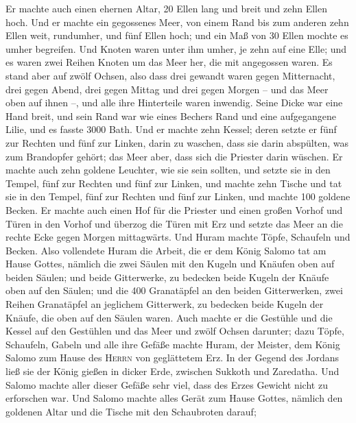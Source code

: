  Er machte auch einen ehernen Altar, 20 Ellen lang und
breit und zehn Ellen hoch.  Und er machte ein gegossenes
Meer, von einem Rand bis zum anderen zehn Ellen weit, rundumher, und
fünf Ellen hoch; und ein Maß von 30 Ellen mochte es umher begreifen.
 Und Knoten waren unter ihm umher, je zehn auf eine Elle;
und es waren zwei Reihen Knoten um das Meer her, die mit angegossen
waren.  Es stand aber auf zwölf Ochsen, also dass drei
gewandt waren gegen Mitternacht, drei gegen Abend, drei gegen Mittag und
drei gegen Morgen -- und das Meer oben auf ihnen --, und alle ihre
Hinterteile waren inwendig.  Seine Dicke war eine Hand
breit, und sein Rand war wie eines Bechers Rand und eine aufgegangene
Lilie, und es fasste 3000 Bath.  Und er machte zehn
Kessel; deren setzte er fünf zur Rechten und fünf zur Linken, darin zu
waschen, dass sie darin abspülten, was zum Brandopfer gehört; das Meer
aber, dass sich die Priester darin wüschen.  Er machte
auch zehn goldene Leuchter, wie sie sein sollten, und setzte sie in den
Tempel, fünf zur Rechten und fünf zur Linken,  und machte
zehn Tische und tat sie in den Tempel, fünf zur Rechten und fünf zur
Linken, und machte 100 goldene Becken.  Er machte auch
einen Hof für die Priester und einen großen Vorhof und Türen in den
Vorhof und überzog die Türen mit Erz  und setzte das Meer
an die rechte Ecke gegen Morgen mittagwärts.  Und Huram
machte Töpfe, Schaufeln und Becken. Also vollendete Huram die Arbeit,
die er dem König Salomo tat am Hause Gottes,  nämlich die
zwei Säulen mit den Kugeln und Knäufen oben auf beiden Säulen; und beide
Gitterwerke, zu bedecken beide Kugeln der Knäufe oben auf den Säulen;
 und die 400 Granatäpfel an den beiden Gitterwerken, zwei
Reihen Granatäpfel an jeglichem Gitterwerk, zu bedecken beide Kugeln der
Knäufe, die oben auf den Säulen waren.  Auch machte er
die Gestühle und die Kessel auf den Gestühlen  und das
Meer und zwölf Ochsen darunter;  dazu Töpfe, Schaufeln,
Gabeln und alle ihre Gefäße machte Huram, der Meister, dem König Salomo
zum Hause des \textsc{Herrn} von geglättetem Erz.  In der
Gegend des Jordans ließ sie der König gießen in dicker Erde, zwischen
Sukkoth und Zaredatha.  Und Salomo machte aller dieser
Gefäße sehr viel, dass des Erzes Gewicht nicht zu erforschen war.
 Und Salomo machte alles Gerät zum Hause Gottes, nämlich
den goldenen Altar und die Tische mit den Schaubroten darauf;

